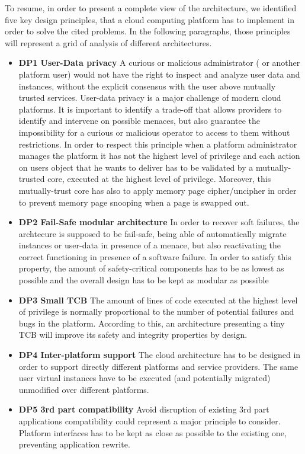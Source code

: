 \documentclass{sig-alternate}
\begin{document}
To resume, in order to present a complete view of the architecture, we identified five key design principles, that a cloud computing platform has to implement in order to solve the cited problems. In the following paragraphs, those principles will represent a grid of analysis of different architectures.
\begin{itemize}[]
\item \textbf{DP1 User-Data privacy} A curious or malicious administrator ( or another platform user) would not have the right to inspect and analyze user data and instances, without the explicit consensus with the user above mutually trusted services. User-data privacy is a major challenge of modern cloud platforms. It is important to identify a trade-off that allows providers to identify and intervene on possible menaces, but also guarantee the impossibility for a curious or malicious operator to access to them without restrictions. In order to respect this principle when a platform administrator manages the platform it has not the highest level of privilege and each action on users object that he wants to deliver has to be validated by a mutually-trusted core, executed at the highest level of privilege. Moreover, this mutually-trust core has also to apply memory page cipher/uncipher in order to prevent memory page snooping when a page is swapped out.
\item \textbf{DP2 Fail-Safe modular architecture} In order to recover soft failures, the archtecure is supposed to be fail-safe, being able of automatically migrate instances or user-data in presence of a menace, but also reactivating the correct functioning in presence of a software failure. In order to satisfy this property, the amount of safety-critical components has to be as lowest as possible and the overall design has to be kept as modular as possible
\item \textbf{DP3 Small TCB} The amount of lines of code executed at the highest level of privilege is normally proportional to the number of potential failures and bugs in the platform. According to this, an architecture presenting a tiny TCB will improve its safety and integrity properties by design.
\item \textbf{DP4 Inter-platform support} The cloud architecture has to be designed in order to support directly different platforms and service providers. The same user virtual instances have to be executed (and potentially migrated) unmodified over different platforms.
\item \textbf{DP5 3rd part compatibility} Avoid disruption of existing 3rd part applications compatibility could represent a major principle to consider. Platform interfaces has to be kept as close as possible to the existing one, preventing application rewrite.
\end{itemize}
\end{document}
